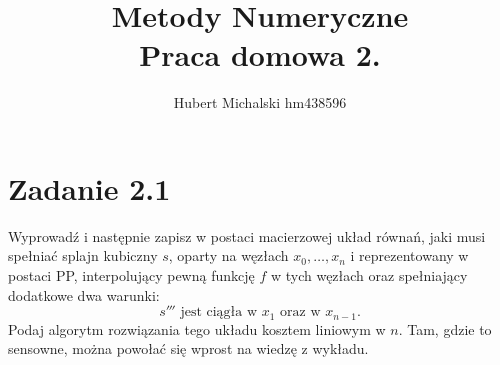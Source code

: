 \documentclass[a4paper]{article}
\title{\vspace{-1cm}
    Metody Numeryczne \\
    \large Praca domowa 2.
}
\author{
    Hubert Michalski hm438596 \\
}
\begin{document}
\maketitle

\section*{Zadanie 2.1}

Wyprowadź i następnie zapisz w postaci macierzowej układ równań, jaki musi spełniać splajn kubiczny $s$, oparty na węzłach $x_0,\dots, x_n$ i reprezentowany w postaci PP, interpolujący pewną funkcję $f$ w tych węzłach oraz spełniający dodatkowe dwa warunki:
$$
s''' \text{ jest ciągła w } x_1 \text{ oraz w } x_{n-1}.
$$
Podaj algorytm rozwiązania tego układu kosztem liniowym w $n$. Tam, gdzie to sensowne, można powołać się wprost na wiedzę z wykładu.
\end{document}
